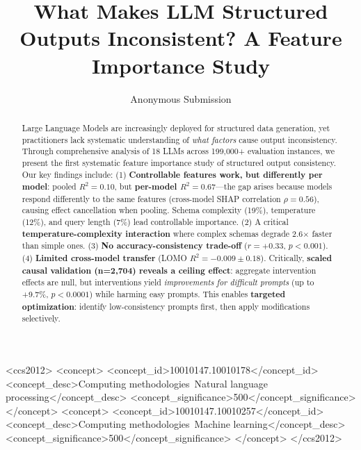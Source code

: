 \documentclass[sigconf,anonymous,review]{acmart}
\begin{document}
\title{What Makes LLM Structured Outputs Inconsistent? A Feature Importance Study}

\author{Anonymous Submission}

\begin{abstract}
Large Language Models are increasingly deployed for structured data generation, yet practitioners lack systematic understanding of \textit{what factors} cause output inconsistency. Through comprehensive analysis of 18 LLMs across 199,000+ evaluation instances, we present the first systematic feature importance study of structured output consistency. Our key findings include: (1) \textbf{Controllable features work, but differently per model}: pooled $R^2=0.10$, but \textbf{per-model $R^2=0.67$}---the gap arises because models respond differently to the same features (cross-model SHAP correlation $\rho=0.56$), causing effect cancellation when pooling. Schema complexity (19\%), temperature (12\%), and query length (7\%) lead controllable importance. (2) A critical \textbf{temperature-complexity interaction} where complex schemas degrade 2.6$\times$ faster than simple ones. (3) \textbf{No accuracy-consistency trade-off} ($r=+0.33$, $p<0.001$). (4) \textbf{Limited cross-model transfer} (LOMO $R^2=-0.009 \pm 0.18$). Critically, \textbf{scaled causal validation (n=2,704) reveals a ceiling effect}: aggregate intervention effects are null, but interventions yield \textit{improvements for difficult prompts} (up to +9.7\%, $p<0.0001$) while harming easy prompts. This enables \textbf{targeted optimization}: identify low-consistency prompts first, then apply modifications selectively.
\end{abstract}

\begin{CCSXML}
<ccs2012>
<concept>
<concept_id>10010147.10010178</concept_id>
<concept_desc>Computing methodologies~Natural language processing</concept_desc>
<concept_significance>500</concept_significance>
</concept>
<concept>
<concept_id>10010147.10010257</concept_id>
<concept_desc>Computing methodologies~Machine learning</concept_desc>
<concept_significance>500</concept_significance>
</concept>
</ccs2012>
\end{CCSXML}


\end{document}
